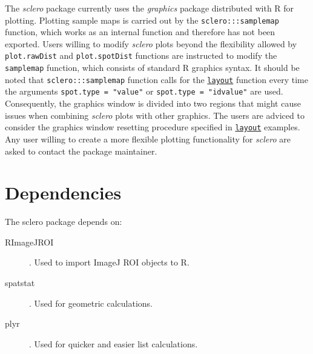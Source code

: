 \documentclass[11pt, a4paper]{article}
\newcommand{\sclero}{\textit{sclero}\xspace}
\begin{document}
The \sclero package currently uses the \textit{graphics} package distributed with R for plotting. Plotting sample maps is carried out by the \texttt{sclero:::samplemap} function, which works as an internal function and therefore has not been exported. Users willing to modify \sclero plots beyond the flexibility allowed by \texttt{plot.rawDist} and \texttt{plot.spotDist} functions are instructed to modify the \texttt{samplemap} function, which consists of standard R graphics syntax. It should be noted that \texttt{sclero:::samplemap} function calls for the \href{https://stat.ethz.ch/R-manual/R-devel/library/graphics/html/layout.html}{\texttt{layout}} function every time the arguments \texttt{spot.type = "value"} or \texttt{spot.type = "idvalue"} are used. Consequently, the graphics window is divided into two regions that might cause issues when combining \sclero plots with other graphics. The users are adviced to consider the graphics window resetting procedure specified in \href{https://stat.ethz.ch/R-manual/R-devel/library/graphics/html/layout.html}{\texttt{layout}} examples. Any user willing to create a more flexible plotting functionality for \sclero are asked to contact the package maintainer.

\section{Dependencies}

The sclero package depends on:

\begin{description}
\item[RImageJROI] \citep{RImageJROI}. Used to import ImageJ ROI objects to R.
\item[spatstat] \citep{Baddeley2005}. Used for geometric calculations.
\item[plyr] \citep{Wickham2011}. Used for quicker and easier list calculations.
\end{description}



\end{document}
